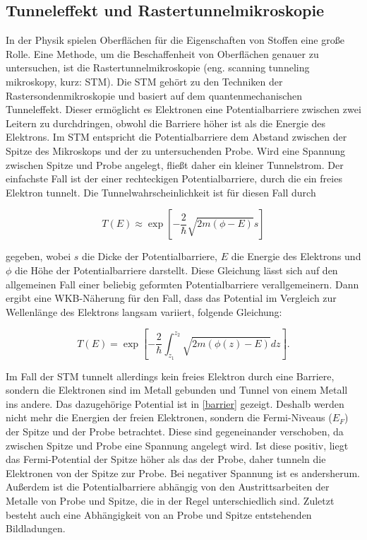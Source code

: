 \documentclass[
	a4paper,
	12pt,
	pagesize,
	ngerman
]{scrartcl}
\begin{document}
\subsection{Tunneleffekt und Rastertunnelmikroskopie}
In der Physik spielen Oberflächen für die Eigenschaften von Stoffen eine große Rolle. Eine Methode, um die Beschaffenheit von Oberflächen genauer zu untersuchen, ist die Rastertunnelmikroskopie (eng. scanning tunneling mikroskopy, kurz: STM). Die STM gehört zu den Techniken der Rastersondenmikroskopie und basiert auf dem  quantenmechanischen Tunneleffekt. Dieser ermöglicht es Elektronen eine Potentialbarriere zwischen zwei Leitern zu durchdringen, obwohl die Barriere höher ist als die Energie des Elektrons. Im STM entspricht die Potentialbarriere dem Abstand zwischen der Spitze des Mikroskops und der zu untersuchenden Probe. Wird eine Spannung zwischen Spitze und Probe angelegt, fließt daher ein kleiner Tunnelstrom. Der einfachste Fall ist der einer rechteckigen Potentialbarriere, durch die ein freies Elektron tunnelt. Die Tunnelwahrscheinlichkeit ist für diesen Fall durch

\begin{equation}
	T(E) \approx \exp [-\frac{2}{\hbar}\sqrt{2m(\phi - E)}s]
\end{equation}

gegeben, wobei $s$ die Dicke der Potentialbarriere, $E$ die Energie des Elektrons und $\phi$ die Höhe der Potentialbarriere darstellt. Diese Gleichung lässt sich auf den allgemeinen Fall einer beliebig geformten Potentialbarriere verallgemeinern. Dann ergibt eine WKB-Näherung für den Fall, dass das Potential im Vergleich zur Wellenlänge des Elektrons langsam variiert, folgende Gleichung:

\begin{equation}
	T(E) = \exp [-\frac{2}{\hbar} \int_{z_1}^{z_2}\sqrt{2m(\phi(z) - E)}dz].
\end{equation}

Im Fall der STM tunnelt allerdings kein freies Elektron durch eine Barriere, sondern die Elektronen sind im Metall gebunden und Tunnel von einem Metall ins andere. Das dazugehörige Potential ist in \cref{barrier} gezeigt. Deshalb werden nicht mehr die Energien der freien Elektronen, sondern die Fermi-Niveaus ($E_F$) der Spitze und der Probe betrachtet. Diese sind gegeneinander verschoben, da zwischen Spitze und Probe eine Spannung angelegt wird. Ist diese positiv, liegt das Fermi-Potential der Spitze höher als das der Probe, daher tunneln die Elektronen von der Spitze zur Probe. Bei negativer Spannung ist es andersherum. Außerdem ist die Potentialbarriere abhängig von den Austrittsarbeiten der Metalle von Probe und Spitze, die in der Regel unterschiedlich sind. Zuletzt besteht auch eine Abhängigkeit von an Probe und Spitze entstehenden Bildladungen.
\end{document}
